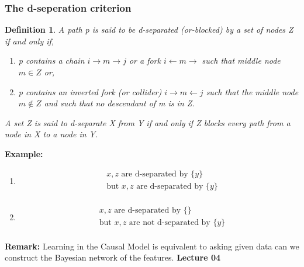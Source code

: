 \documentclass{article}
\newtheorem{definition}{Definition}[section]
\begin{document}
    \subsubsection{The d-seperation criterion}
    \begin{definition}
        A path p is said to be d-separated (or-blocked) by a set of nodes Z if and only if,
        \begin{enumerate}
            \item p contains a chain $i \rightarrow m \rightarrow j$ or a fork $i \leftarrow m \rightarrow$ such that middle node $m \in Z$ or,
            \item p contains an inverted fork (or collider) $i \rightarrow m \leftarrow j$ such that the middle node $m \notin Z$ and such that no descendant of m is in Z.
        \end{enumerate}
        A set Z is said to d-separate X from Y if and only if Z blocks every path from a node in X to a node in Y.
    \end{definition}
    \textbf{Example:}
    \begin{enumerate}
        \item 
        
        \begin{align*}
            &x, z \text{ are d-separated by }\{y\}\\
            & \text{but } x, z \text{ are d-separated by }\{y\}\\
        \end{align*}
        \item 
      
        \begin{align*}
            &x, z \text{ are d-separated by }\{\}\\
            & \text{but } x, z \text{ are not d-separated by }\{y\}\\
        \end{align*}
    \end{enumerate}
    \textbf{Remark:} Learning in the Causal Model is equivalent to asking given data can we construct the Bayesian network of the features.
    \textbf{Lecture 04}
%	
%	
    
\end{document}
